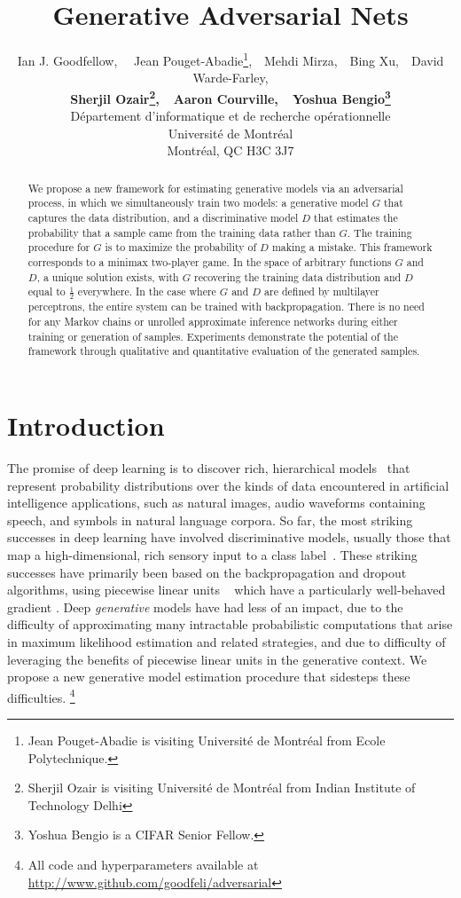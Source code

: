 \documentclass{article}
\title{Generative Adversarial Nets}
\author{
Ian J. Goodfellow,
\ \  Jean Pouget-Abadie\thanks{Jean Pouget-Abadie is visiting Universit\'e de Montr\'eal from Ecole Polytechnique.
},\ \  Mehdi Mirza,\ \  Bing Xu,\ \ David Warde-Farley,\\
{\bf Sherjil Ozair\thanks{Sherjil Ozair is visiting Universit\'e de Montr\'eal from Indian Institute of Technology Delhi},\ \ Aaron Courville,\ \ Yoshua Bengio\thanks{Yoshua Bengio is a CIFAR Senior Fellow.}}\\
D\'epartement d'informatique et de recherche op\'erationnelle\\
Universit\'e de Montr\'eal\\
Montr\'eal, QC H3C 3J7 \\
}
\begin{document}
\maketitle

\begin{abstract}
We propose a new framework for estimating generative models
via an adversarial process, in which we simultaneously train
two models: a generative model $G$ that captures the data
distribution, and a discriminative model $D$ that estimates the
probability that a sample came from the training data rather than $G$.
The training procedure for $G$ is to maximize the probability of $D$ making
a mistake. This framework corresponds to a minimax two-player game. In the
space of arbitrary functions $G$ and $D$, a unique solution exists, with $G$
recovering the training data distribution and $D$ equal to $\frac{1}{2}$
everywhere. In the case where $G$ and $D$ are defined by multilayer perceptrons,
the entire system can be trained with backpropagation. There is no need for any Markov chains
or unrolled approximate inference networks during either training or generation
of samples. Experiments demonstrate the potential of the framework
through qualitative and quantitative evaluation of the generated
samples. 
\end{abstract}

\section{Introduction}

The promise of deep learning is to discover rich, hierarchical models~\citep{Bengio-2009-book} that represent
probability distributions over the kinds of data encountered in artificial intelligence applications,
 such as natural images, audio waveforms containing speech, and symbols in natural language corpora.
So far, the most striking successes in deep learning have involved discriminative models,
usually those that map a high-dimensional, rich sensory input to a class 
label~\citep{Hinton-et-al-2012,Krizhevsky-2012-small}. These
striking successes have primarily been based on the backpropagation and dropout algorithms, using
piecewise linear units
~\cite{Jarrett-ICCV2009,Glorot+al-AI-2011-small,Goodfellow_maxout_2013} which have a particularly well-behaved gradient
. Deep {\em generative} models have had less of an impact, due to the difficulty of approximating
many intractable probabilistic computations that arise in maximum likelihood estimation and
related strategies, and due to difficulty of leveraging the benefits of piecewise linear units in
the generative context. We propose a new generative model estimation procedure that sidesteps these difficulties.
\footnote{All code and hyperparameters available at \url{http://www.github.com/goodfeli/adversarial}}
\end{document}
